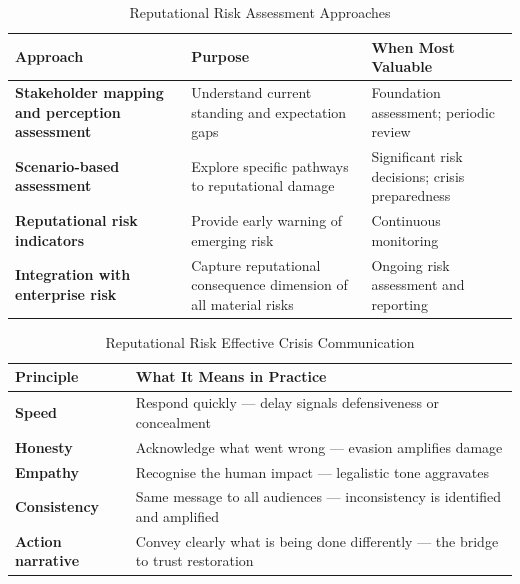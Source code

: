 \begin{table}[H]
  \centering
  \renewcommand{\arraystretch}{1.5}
  \begin{tabularx}{\textwidth}{ | >{\raggedright\arraybackslash}p{} 
								| >{\raggedright\arraybackslash}p{} 
                                | >{\raggedright\arraybackslash}X | }
    \hline
    \textbf{Approach} & \textbf{Purpose} & \textbf{When Most Valuable} \\
    \hline
    \textbf{Stakeholder mapping and perception assessment} & Understand current standing and expectation gaps & Foundation assessment; periodic review\\
    \hline
    \textbf{Scenario-based assessment} & Explore specific pathways to reputational damage & Significant risk decisions; crisis preparedness\\
    \hline
    \textbf{Reputational risk indicators} & Provide early warning of emerging risk & Continuous monitoring\\
    \hline
    \textbf{Integration with enterprise risk} & Capture reputational consequence dimension of all material risks & Ongoing risk assessment and reporting\\
    \hline
  \end{tabularx}
  \caption{Reputational Risk Assessment Approaches}
\end{table}

\begin{table}[H]
  \centering
  \renewcommand{\arraystretch}{1.5}
  \begin{tabularx}{\textwidth}{ | >{\raggedright\arraybackslash}p{} 
                                | >{\raggedright\arraybackslash}X | }
    \hline
    \textbf{Principle} & \textbf{What It Means in Practice} \\
    \hline
    \textbf{Speed} & Respond quickly — delay signals defensiveness or concealment\\
    \hline
    \textbf{Honesty} & Acknowledge what went wrong — evasion amplifies damage\\
    \hline
    \textbf{Empathy} & Recognise the human impact — legalistic tone aggravates\\
    \hline
    \textbf{Consistency} & Same message to all audiences — inconsistency is identified and amplified\\
    \hline
    \textbf{Action narrative} & Convey clearly what is being done differently — the bridge to trust restoration\\
    \hline
  \end{tabularx}
  \caption{Reputational Risk Effective Crisis Communication}
\end{table}

